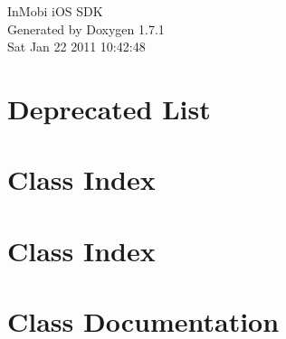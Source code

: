 \documentclass[a4paper]{book}
\begin{document}
\hypersetup{pageanchor=false}
\begin{titlepage}
\vspace*{7cm}
\begin{center}
{\Large InMobi iOS SDK }\\
\vspace*{1cm}
{\large Generated by Doxygen 1.7.1}\\
\vspace*{0.5cm}
{\small Sat Jan 22 2011 10:42:48}\\
\end{center}
\end{titlepage}
\clearemptydoublepage
{}
\tableofcontents
\clearemptydoublepage
{}
\hypersetup{pageanchor=true}
\chapter{Deprecated List}
\label{deprecated}
\hypertarget{deprecated}{}

\chapter{Class Index}

\chapter{Class Index}

\chapter{Class Documentation}










\printindex
\end{document}
